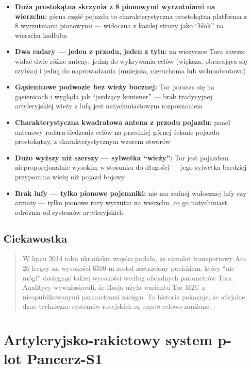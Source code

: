 \documentclass[12pt,oneside]{book}
\providecommand{\tightlist}{%
  \setlength{\itemsep}{0pt}\setlength{\parskip}{0pt}}
\begin{document}
\begin{itemize}
\tightlist
\item
  \textbf{Duża prostokątna skrzynia z 8 pionowymi wyrzutniami na
  wierzchu:} górna część pojazdu to charakterystyczna prostokątna
  platforma z 8 wyrzutniami pionowymi --- widoczna z każdej strony jako
  ``blok'' na wierzchu kadłuba
\item
  \textbf{Dwa radary --- jeden z przodu, jeden z tyłu:} na wieżyczce
  Tora zawsze widać dwie różne anteny: jedną do wykrywania celów
  (większa, obracająca się szybko) i jedną do naprowadzania (mniejsza,
  nieruchoma lub wolnoobrotowa)
\item
  \textbf{Gąsienicowe podwozie bez wieży bocznej:} Tor porusza się na
  gąsienicach i wygląda jak ``jeżdżący kontener'' --- brak tradycyjnej
  artyleryjskiej wieży z lufą jest natychmiastowym rozpoznaniem
\item
  \textbf{Charakterystyczna kwadratowa antena z przodu pojazdu:} panel
  antenowy radaru śledzenia celów na przedniej górnej ścianie pojazdu
  --- prostokątny, z charakterystycznym wzorem otworów
\item
  \textbf{Dużo wyższy niż szerszy --- sylwetka ``wieży'':} Tor jest
  pojazdem nieproporcjonalnie wysokim w stosunku do długości --- jego
  sylwetka bardziej przypomina wieżę niż pojazd bojowy
\item
  \textbf{Brak lufy --- tylko pionowe pojemniki:} nie ma żadnej
  widocznej lufy czy armaty --- tylko pionowe rury wyrzutni na wierzchu,
  co go natychmiast odróżnia od systemów artyleryjskich
\end{itemize}

\subsection{Ciekawostka}\label{ciekawostka-44}

\begin{quote}
W lipcu 2014 roku ukraińskie wojsko podało, że samolot transportowy
An-26 lecący na wysokości 6500 m został zestrzelony pociskiem, który
``nie mógł'' dosięgnąć takiej wysokości według oficjalnych parametrów
Tora. Analitycy wywnioskwali, że Rosja użyła wariantu Tor-M2U z
nieopublikowanymi parametrami zasięgu. Ta historia pokazuje, że
oficjalne dane techniczne systemów rosyjskich są często celowo zaniżane.
\end{quote}

\section{Artyleryjsko-rakietowy system p-lot
Pancerz-S1}\label{artyleryjsko-rakietowy-system-p-lot-pancerz-s1}
\end{document}
